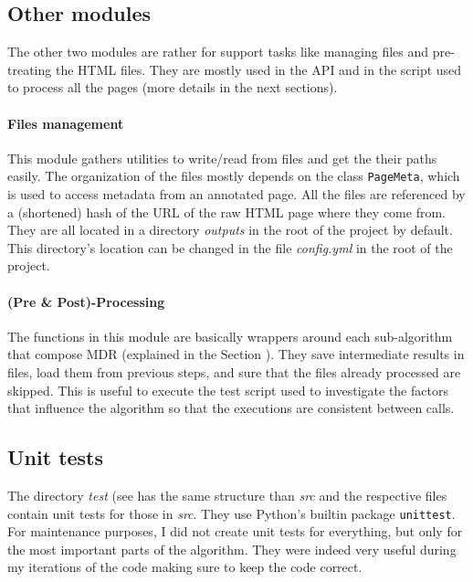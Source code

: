 \documentclass[10pt]{article}
\newcommand{\code}[1]{\colorbox{codegray}{\texttt{#1}}}
\begin{document}
\subsection{Other modules} \label{txt:other-modules}

The other two modules are rather for support tasks like managing files and pre-treating the HTML files. They are mostly used in the API and in the script used to process all the pages (more details in the next sections). 

\paragraph{Files management} 

This module gathers utilities to write/read from files and get the their paths easily. The organization of the files mostly depends on the class \code{PageMeta}, which is used to access metadata from an annotated page. All the files are referenced by a (shortened) hash of the URL of the raw HTML page where they come from. They are all located in a directory \emph{outputs} in the root of the project by default. This directory's location can be changed in the file \emph{config.yml} in the root of the project.

\paragraph{(Pre \& Post)-Processing}

The functions in this module are basically wrappers around each sub-algorithm that compose MDR (explained in the Section ). They save intermediate results in files, load them from previous steps, and sure that the files already processed are skipped. This is useful to execute the test script used to investigate the factors that influence the algorithm so that the executions are consistent between calls.



\subsection{Unit tests}

The directory \emph{test} (see has the same structure than \emph{src} and the respective files contain unit tests for those in \emph{src}. They use Python's builtin package \code{unittest}. For maintenance purposes, I did not create unit tests for everything, but only for the most important parts of the algorithm. They were indeed very useful during my iterations of the code making sure to keep the code correct. 
\end{document}
